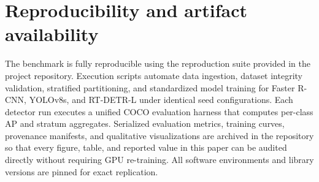 \documentclass[11pt,a4paper,twocolumn]{article}
\begin{document}
\section{Reproducibility and artifact availability}
\label{sec:reproducibility}

The benchmark is fully reproducible using the reproduction suite provided in the
project repository. Execution scripts automate data ingestion, dataset integrity
validation, stratified partitioning, and standardized model training for Faster R-CNN,
YOLOv8s, and RT-DETR-L under identical seed configurations. Each detector run executes
a unified COCO evaluation harness that computes per-class AP and stratum aggregates.
Serialized evaluation metrics, training curves, provenance manifests, and qualitative
visualizations are archived in the repository so that every figure, table, and reported
value in this paper can be audited directly without requiring GPU re-training. All software
environments and library versions are pinned for exact replication.

\clearpage
\nocite{*}


\end{document}
